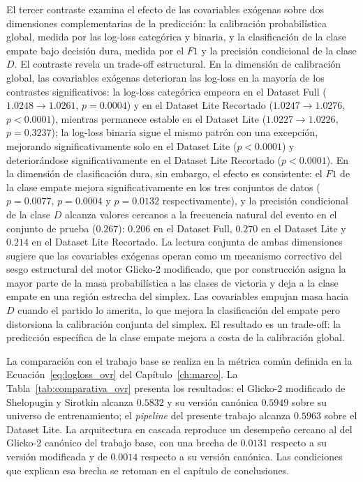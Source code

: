El tercer contraste examina el efecto de las covariables ex\'ogenas sobre dos dimensiones complementarias de la predicci\'on: la calibraci\'on probabil\'istica global, medida por las log-loss categ\'orica y binaria, y la clasificaci\'on de la clase empate bajo decisi\'on dura, medida por el $F1$ y la precisi\'on condicional de la clase $D$. El contraste revela un trade-off estructural. En la dimensi\'on de calibraci\'on global, las covariables ex\'ogenas deterioran las log-loss en la mayor\'ia de los contrastes significativos: la log-loss categ\'orica empeora en el Dataset Full ($1{.}0248 \to 1{.}0261$, $p=0{.}0004$) y en el Dataset Lite Recortado ($1{.}0247 \to 1{.}0276$, $p<0{.}0001$), mientras permanece estable en el Dataset Lite ($1{.}0227 \to 1{.}0226$, $p=0{.}3237$); la log-loss binaria sigue el mismo patr\'on con una excepci\'on, mejorando significativamente solo en el Dataset Lite ($p<0{.}0001$) y deterior\'andose significativamente en el Dataset Lite Recortado ($p<0{.}0001$). En la dimensi\'on de clasificaci\'on dura, sin embargo, el efecto es consistente: el $F1$ de la clase empate mejora significativamente en los tres conjuntos de datos ($p=0{.}0077$, $p=0{.}0004$ y $p=0{.}0132$ respectivamente), y la precisi\'on condicional de la clase $D$ alcanza valores cercanos a la frecuencia natural del evento en el conjunto de prueba ($0{.}267$): $0{.}206$ en el Dataset Full, $0{.}270$ en el Dataset Lite y $0{.}214$ en el Dataset Lite Recortado. La lectura conjunta de ambas dimensiones sugiere que las covariables ex\'ogenas operan como un mecanismo correctivo del sesgo estructural del motor Glicko-2 modificado, que por construcci\'on asigna la mayor parte de la masa probabil\'istica a las clases de victoria y deja a la clase empate en una regi\'on estrecha del simplex. Las covariables empujan masa hacia $D$ cuando el partido lo amerita, lo que mejora la clasificaci\'on del empate pero distorsiona la calibraci\'on conjunta del simplex. El resultado es un trade-off: la predicci\'on espec\'ifica de la clase empate mejora a costa de la calibraci\'on global.

La comparaci\'on con el trabajo base se realiza en la m\'etrica com\'un definida en la Ecuaci\'on~\eqref{eq:logloss_ovr} del Cap\'itulo~\ref{ch:marco}. La Tabla~\ref{tab:comparativa_ovr} presenta los resultados: el Glicko-2 modificado de Shelopugin y Sirotkin alcanza $0{.}5832$ y su versi\'on can\'onica $0{.}5949$ sobre su universo de entrenamiento; el \textit{pipeline} del presente trabajo alcanza $0{.}5963$ sobre el Dataset Lite. La arquitectura en cascada reproduce un desempe\~no cercano al del Glicko-2 can\'onico del trabajo base, con una brecha de $0{.}0131$ respecto a su versi\'on modificada y de $0{.}0014$ respecto a su versi\'on can\'onica. Las condiciones que explican esa brecha se retoman en el cap\'itulo de conclusiones.

